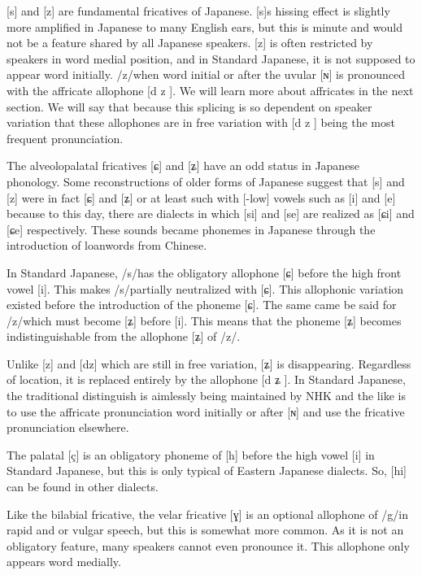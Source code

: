 \par{ [s] and [z] are fundamental fricatives of Japanese. [s]\textquotesingle s hissing effect is slightly more amplified in Japanese to many English ears, but this is minute and would not be a feature shared by all Japanese speakers. [z] is often restricted by speakers in word medial position, and in Standard Japanese, it is not supposed to appear word initially. \slash z\slash  when word initial or after the uvular [ɴ] is pronounced with the affricate allophone [d z ]. We will learn more about affricates in the next section. We will say that because this splicing is so dependent on speaker variation that these allophones are in free variation with [d z ] being the most frequent pronunciation. }

\par{ The alveolopalatal fricatives [ɕ] and [ʑ] have an odd status in Japanese phonology. Some reconstructions of older forms of Japanese suggest that [s] and [z] were in fact [ɕ] and [ʑ] or at least such with [-low] vowels such as [i] and [e] because to this day, there are dialects in which [si] and [se] are realized as [ɕi] and [ɕe] respectively. These sounds became phonemes in Japanese through the introduction of loanwords from Chinese. }

\par{ In Standard Japanese, \slash s\slash  has the obligatory allophone [ɕ] before the high front vowel [i]. This makes \slash s\slash  partially neutralized with [ɕ]. This allophonic variation existed before the introduction of the phoneme [ɕ]. The same came be said for \slash z\slash  which must become [ʑ] before [i]. This means that the phoneme [ʑ] becomes indistinguishable from the allophone [ʑ] of \slash z\slash . }

\par{  Unlike [z] and [dz] which are still in free variation, [ʑ] is disappearing. Regardless of location, it is replaced entirely by the allophone [d ʑ ]. In Standard Japanese, the traditional distinguish is aimlessly being maintained by NHK and the like is to use the affricate pronunciation word initially or after [ɴ] and use the fricative pronunciation elsewhere. }

\par{ The palatal [ç] is an obligatory phoneme of [h] before the high vowel [i] in Standard Japanese, but this is only typical of Eastern Japanese dialects. So, [hi] can be found in other dialects. }

\par{ Like the bilabial fricative, the velar fricative [ɣ] is an optional allophone of \slash g\slash  in rapid and or vulgar speech, but this is somewhat more common. As it is not an obligatory feature, many speakers cannot even pronounce it. This allophone only appears word medially. }

